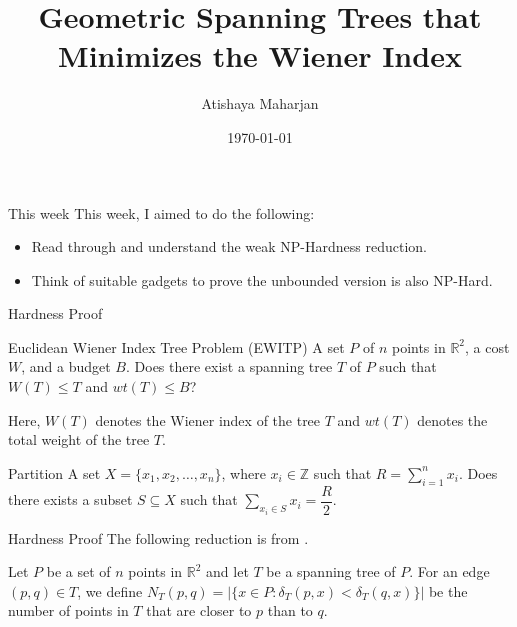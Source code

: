 \documentclass[11pt]{beamer}
\author[Atishaya Maharjan]{Atishaya Maharjan}
\title{Geometric Spanning Trees that Minimizes the Wiener Index}
\institute[]{University of Manitoba\par Geometric, Approximation, and Distributed Algorithms (GADA) lab}
\date{\today}
\begin{document}
\begin{frame}
	\titlepage
\end{frame}

\begin{frame}{This week}
	This week, I aimed to do the following:
	\begin{itemize}
		\item Read through and understand the weak NP-Hardness reduction.
		      \pause
		\item Think of suitable gadgets to prove the unbounded version is also NP-Hard.
	\end{itemize}
\end{frame}

\begin{frame}{Hardness Proof}
	\begin{decisionblock}{Euclidean Wiener Index Tree Problem (EWITP)}
		{A set $P$ of $n$ points in $\mathbb{R}^2$, a cost $W$, and a budget $B$.}
		{Does there exist a spanning tree $T$ of $P$ such that $W(T) \leq T$ and $wt(T) \leq B$?}
	\end{decisionblock}

	Here, $W(T)$ denotes the Wiener index of the tree $T$ and $wt(T)$ denotes the total weight of the tree $T$.

	\begin{decisionblock}{Partition}
		{A set $X = \{x_1, x_2, \dots, x_n\}$, where $x_i \in \mathbb{Z}$ such that $R = \displaystyle\sum_{i = 1}^{n}x_i$.}
		{Does there exists a subset $S \subseteq X$ such that $\displaystyle\sum_{x_i \in S}x_i = \dfrac{R}{2}$.}
	\end{decisionblock}
\end{frame}

\begin{frame}{Hardness Proof}
	The following reduction is from \cite{article:geometric_spanning_trees_minimizing_wiener_index}.
	\begin{definition}
		Let $P$ be a set of $n$ points in $\mathbb{R}^2$ and let $T$ be a spanning tree of $P$.
		For an edge $(p, q) \in T$, we define $N_T(p, q) = |\{x\in P: \delta_T(p, x) < \delta_T(q,x)\}|$ be the number of points in $T$ that are closer to $p$ than to $q$.
	\end{definition}
\end{frame}
\end{document}
